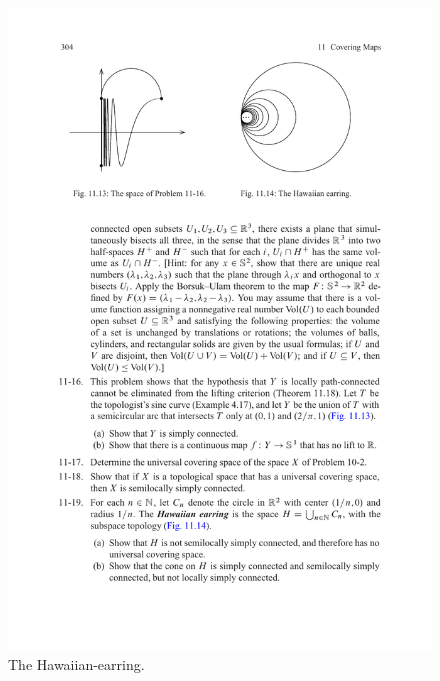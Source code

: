 \begin{figure}[htbp]
\begin{minipage}{200pt}
\includegraphics{pictures/Hawaiian-earring}
\caption{The Hawaiian-earring.}
\end{minipage}
\end{figure}
